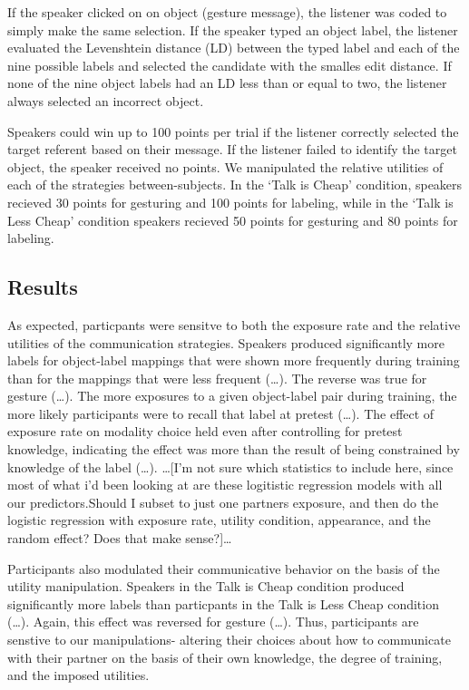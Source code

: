 \documentclass[10pt, letterpaper]{article}
\begin{document}
If the speaker clicked on on object (gesture message), the listener was
coded to simply make the same selection. If the speaker typed an object
label, the listener evaluated the Levenshtein distance (LD) between the
typed label and each of the nine possible labels and selected the
candidate with the smalles edit distance. If none of the nine object
labels had an LD less than or equal to two, the listener always selected
an incorrect object.

Speakers could win up to 100 points per trial if the listener correctly
selected the target referent based on their message. If the listener
failed to identify the target object, the speaker received no points. We
manipulated the relative utilities of each of the strategies
between-subjects. In the `Talk is Cheap' condition, speakers recieved 30
points for gesturing and 100 points for labeling, while in the `Talk is
Less Cheap' condition speakers recieved 50 points for gesturing and 80
points for labeling.

\subsection{Results}\label{results}

As expected, particpants were sensitve to both the exposure rate and the
relative utilities of the communication strategies. Speakers produced
significantly more labels for object-label mappings that were shown more
frequently during training than for the mappings that were less frequent
(\ldots{}). The reverse was true for gesture (\ldots{}). The more
exposures to a given object-label pair during training, the more likely
participants were to recall that label at pretest (\ldots{}). The effect
of exposure rate on modality choice held even after controlling for
pretest knowledge, indicating the effect was more than the result of
being constrained by knowledge of the label (\ldots{}). \ldots{}{[}I'm
not sure which statistics to include here, since most of what i'd been
looking at are these logitistic regression models with all our
predictors.Should I subset to just one partners exposure, and then do
the logistic regression with exposure rate, utility condition,
appearance, and the random effect? Does that make sense?{]}\ldots{}

Participants also modulated their communicative behavior on the basis of
the utility manipulation. Speakers in the Talk is Cheap condition
produced significantly more labels than particpants in the Talk is Less
Cheap condition (\ldots{}). Again, this effect was reversed for gesture
(\ldots{}). Thus, participants are senstive to our manipulations-
altering their choices about how to communicate with their partner on
the basis of their own knowledge, the degree of training, and the
imposed utilities.
\end{document}
